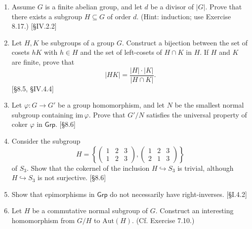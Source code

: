 \begin{enumerate}
    \item Assume $G$ is a finite abelian group, and let $d$ be a divisor of $|G|$. Prove that there exists a subgroup $H \subseteq G$ of order $d$. (Hint: induction; use Exercise 8.17.) [\S IV.2.2]

    \item Let $H, K$ be subgroups of a group $G$. Construct a bijection between the set of cosets $hK$ with $h \in H$ and the set of left-cosets of $H \cap K$ in $H$. If $H$ and $K$ are finite, prove that
          \[ |HK| = \frac{|H| \cdot |K|}{|H \cap K|}. \]
          [\S8.5, \S IV.4.4]

    \item Let $\varphi: G \to G'$ be a group homomorphism, and let $N$ be the smallest normal subgroup containing $\text{im}\,\varphi$. Prove that $G'/N$ satisfies the universal property of coker $\varphi$ in $\mathsf{Grp}$. [\S8.6]

    \item Consider the subgroup
          \[ H = \left\{ \begin{pmatrix} 1 & 2 & 3 \\ 1 & 2 & 3 \end{pmatrix}, \begin{pmatrix} 1 & 2 & 3 \\ 2 & 1 & 3 \end{pmatrix} \right\} \]
          of $S_3$. Show that the cokernel of the inclusion $H \hookrightarrow S_3$ is trivial, although $H \hookrightarrow S_3$ is not surjective. [\S8.6]

    \item Show that epimorphisms in $\mathsf{Grp}$ do not necessarily have right-inverses. [\S I.4.2]

    \item Let $H$ be a commutative normal subgroup of $G$. Construct an interesting homomorphism from $G/H$ to $\text{Aut}(H)$. (Cf. Exercise 7.10.)
\end{enumerate}
